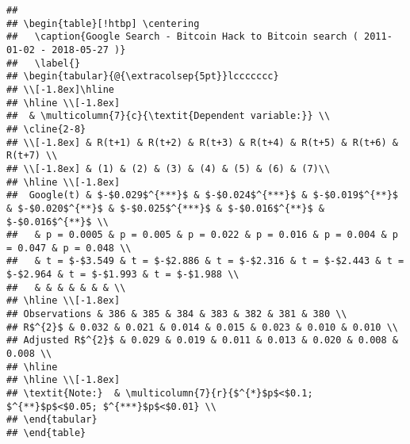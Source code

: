 \documentclass[
]{article}
\newenvironment{Shaded}{\begin{snugshade}}{\end{snugshade}}
\newcommand{\CommentTok}[1]{\textcolor[rgb]{0.56,0.35,0.01}{\textit{#1}}}
\begin{document}
\begin{verbatim}
## 
## \begin{table}[!htbp] \centering 
##   \caption{Google Search - Bitcoin Hack to Bitcoin search ( 2011-01-02 - 2018-05-27 )} 
##   \label{} 
## \begin{tabular}{@{\extracolsep{5pt}}lccccccc} 
## \\[-1.8ex]\hline 
## \hline \\[-1.8ex] 
##  & \multicolumn{7}{c}{\textit{Dependent variable:}} \\ 
## \cline{2-8} 
## \\[-1.8ex] & R(t+1) & R(t+2) & R(t+3) & R(t+4) & R(t+5) & R(t+6) & R(t+7) \\ 
## \\[-1.8ex] & (1) & (2) & (3) & (4) & (5) & (6) & (7)\\ 
## \hline \\[-1.8ex] 
##  Google(t) & $-$0.029$^{***}$ & $-$0.024$^{***}$ & $-$0.019$^{**}$ & $-$0.020$^{**}$ & $-$0.025$^{***}$ & $-$0.016$^{**}$ & $-$0.016$^{**}$ \\ 
##   & p = 0.0005 & p = 0.005 & p = 0.022 & p = 0.016 & p = 0.004 & p = 0.047 & p = 0.048 \\ 
##   & t = $-$3.549 & t = $-$2.886 & t = $-$2.316 & t = $-$2.443 & t = $-$2.964 & t = $-$1.993 & t = $-$1.988 \\ 
##   & & & & & & & \\ 
## \hline \\[-1.8ex] 
## Observations & 386 & 385 & 384 & 383 & 382 & 381 & 380 \\ 
## R$^{2}$ & 0.032 & 0.021 & 0.014 & 0.015 & 0.023 & 0.010 & 0.010 \\ 
## Adjusted R$^{2}$ & 0.029 & 0.019 & 0.011 & 0.013 & 0.020 & 0.008 & 0.008 \\ 
## \hline 
## \hline \\[-1.8ex] 
## \textit{Note:}  & \multicolumn{7}{r}{$^{*}$p$<$0.1; $^{**}$p$<$0.05; $^{***}$p$<$0.01} \\ 
## \end{tabular} 
## \end{table}
\end{verbatim}

\begin{Shaded}
\end{Shaded}
\end{document}
